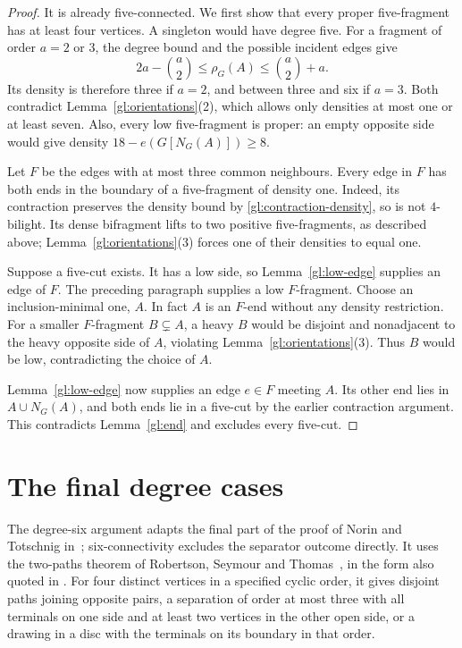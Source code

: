 \begin{proof}
It is already five-connected. We first show that every proper
five-fragment has at least four vertices. A singleton would have
degree five. For a fragment of order $a=2$ or $3$, the degree bound
and the possible incident edges give
\[
 2a-\binom a2\leq\rho_G(A)\leq\binom a2+a.
\]
Its density is therefore three if $a=2$, and between three and six
if $a=3$. Both contradict Lemma~\ref{gl:orientations}(2), which
allows only densities at most one or at least seven. Also, every
low five-fragment is proper: an empty opposite side would give
density $18-e(G[N_G(A)])\geq8$.

Let $F$ be the edges with at most three common neighbours. Every
edge in $F$ has both ends in the boundary of a five-fragment of
density one. Indeed, its contraction preserves the density bound
by \eqref{gl:contraction-density}, so is not $4$-bilight. Its dense
bifragment lifts to two positive five-fragments, as described above;
Lemma~\ref{gl:orientations}(3) forces one of their densities to equal one.

Suppose a five-cut exists. It has a low side, so
Lemma~\ref{gl:low-edge} supplies an edge of $F$. The preceding
paragraph supplies a low $F$-fragment. Choose an inclusion-minimal
one, $A$. In fact $A$ is an $F$-end without any density restriction.
For a smaller $F$-fragment $B\subsetneq A$, a heavy $B$ would be
disjoint and nonadjacent to the heavy opposite side of $A$, violating
Lemma~\ref{gl:orientations}(3). Thus $B$ would be low, contradicting
the choice of $A$.

Lemma~\ref{gl:low-edge} now supplies an edge $e\in F$ meeting $A$.
Its other end lies in $A\cup N_G(A)$, and both ends lie in a
five-cut by the earlier contraction argument. This contradicts
Lemma~\ref{gl:end} and excludes every five-cut.
\end{proof}

\section{The final degree cases}
\label{sec:global-terminal}

The degree-six argument adapts the final part of the proof of
Norin and Totschnig in~\cite[Section~3]{NT2025}; six-connectivity
excludes the separator outcome directly. It uses
the two-paths theorem of Robertson, Seymour and
Thomas~\cite[Theorem~(2.4)]{RST1993}, in the form also
quoted in \cite[Theorem~13]{NT2025}. For four distinct vertices in
a specified cyclic order, it gives disjoint paths joining opposite
pairs, a separation of order at most three with all terminals on
one side and at least two vertices in the other open side, or a
drawing in a disc with the terminals on its boundary in that order.


